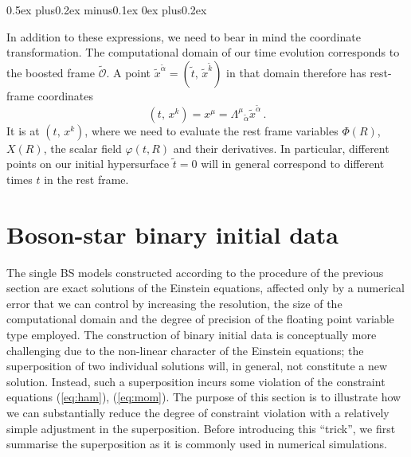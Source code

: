 \documentclass[]{iopart}
\begin{document}
\begin{list}{\rm{\bf ()}}{
                
             \parsep0.5ex plus0.2ex minus0.1ex \itemsep0ex plus0.2ex}
  \item In addition to these expressions, we need to bear in mind the coordinate
  transformation. The computational domain of our time evolution corresponds
  to the boosted frame $\tilde{\mathcal{O}}$. A
  point $\tilde{x}^{\tilde{\alpha}}=(\tilde{t},\,\tilde{x}^{\tilde{k}})$
  in that domain therefore has rest-frame coordinates
  \begin{equation}
     (t,\,x^k) = x^{\mu} = \Lambda^{\mu}{}_{\tilde{\alpha}}\tilde{x}^{\tilde{\alpha}}\,.
  \end{equation}
  It is at $(t,\,x^k)$, where we need to evaluate the rest frame variables
  $\Phi(R)$, $X(R)$, the scalar field $\varphi(t,R)$ and their
  derivatives. In particular, different points on our initial
  hypersurface $\tilde{t}=0$ will in general correspond to different
  times $t$ in the rest frame.
\end{list}
%

\section{Boson-star binary initial data}
\label{sec:superposition}
%
The single BS models constructed according to the procedure of the
previous section are exact solutions of the Einstein equations, affected
only by a numerical error that we can control by increasing the resolution,
the size of the computational domain and the degree of precision of the floating
point variable type employed. The construction of binary initial data is
conceptually more challenging due to the non-linear character of the
Einstein equations; the superposition of two individual solutions will,
in general, not constitute a new solution. Instead, such a superposition
incurs some violation of the constraint equations (\ref{eq:ham}),
(\ref{eq:mom}). The purpose of this section is to illustrate
how we can substantially reduce the degree of constraint
violation with a relatively simple adjustment in the
superposition. Before introducing this ``trick'', we first
summarise the superposition as it is commonly used in numerical
simulations.

\end{document}

